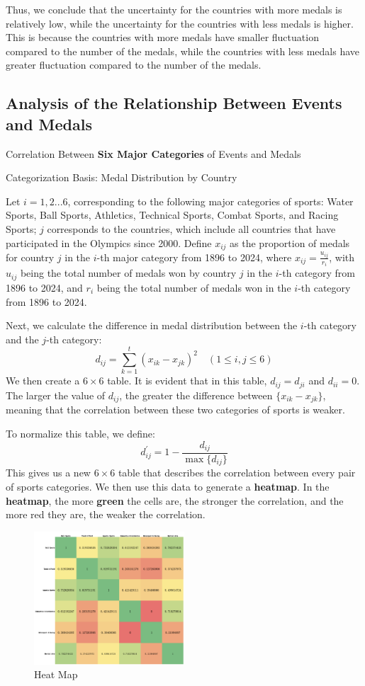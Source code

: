 \documentclass{mcmthesis}  %
\begin{document}
Thus, we conclude that the uncertainty for the countries with more medals is relatively low, while the uncertainty for the countries with less medals is higher. This is because the countries with more medals have smaller fluctuation compared to the number of the medals, while the countries with less medals have greater fluctuation compared to the number of the medals. 


\subsection{Analysis of the Relationship Between Events and Medals}
Correlation Between \textbf{Six Major Categories} of Events and Medals

Categorization Basis: Medal Distribution by Country

Let $i=1,2...6$, corresponding to the following major categories of sports: Water Sports, Ball Sports, Athletics, Technical Sports, Combat Sports, and Racing Sports; $j$ corresponds to the countries, which include all countries that have participated in the Olympics since 2000. Define $x_{ij}$ as the proportion of medals for country $j$ in the $i$-th major category from 1896 to 2024, where $x_{ij} = \frac{u_{ij}}{r_i}$, with $u_{ij}$ being the total number of medals won by country $j$ in the $i$-th category from 1896 to 2024, and $r_i$ being the total number of medals won in the $i$-th category from 1896 to 2024.

Next, we calculate the difference in medal distribution between the $i$-th category and the $j$-th category: 
\[
d_{ij} = \sum_{k=1}^t(x_{ik} - x_{jk})^2 \quad (1 \leq i,j \leq 6)
\]
We then create a $6 \times 6$ table. It is evident that in this table, $d_{ij} = d_{ji}$ and $d_{ii} = 0$. The larger the value of $d_{ij}$, the greater the difference between $\{x_{ik}-x_{jk}\}$, meaning that the correlation between these two categories of sports is weaker.

To normalize this table, we define:
\[
d_{ij}^{'} = 1 - \frac{d_{ij}}{\max\{d_{ij}\}}
\]
This gives us a new $6 \times 6$ table that describes the correlation between every pair of sports categories. We then use this data to generate a \textbf{heatmap}. In the \textbf{heatmap}, the more \textbf{green} the cells are, the stronger the correlation, and the more red they are, the weaker the correlation.

\begin{figure}[H]
    \centering
    \includegraphics[width=0.5\textwidth]{image/heat_map.png}  %
    \caption{Heat Map}
    \label{fig:new_event_sim}
\end{figure}
\end{document}
